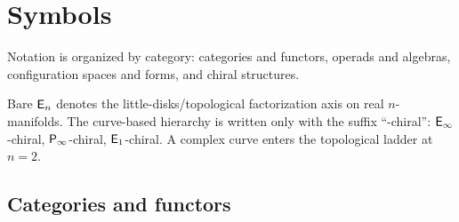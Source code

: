\chapter{Symbols}
\label{app:notation}


Notation is organized by category: categories and functors, operads
and algebras, configuration spaces and forms, and chiral structures.

\begin{remark}
Bare $\mathsf{E}_n$ denotes the little-disks/topological factorization axis on
real $n$-manifolds.  The curve-based hierarchy is written only with the
suffix ``-chiral'': $\mathsf{E}_{\infty}$-chiral, $\mathsf{P}_{\infty}$-chiral, $\mathsf{E}_1$-chiral.
A complex curve enters the topological ladder at $n = 2$.
\end{remark}

\section{Categories and functors}
\label{sec:notation-categories}

